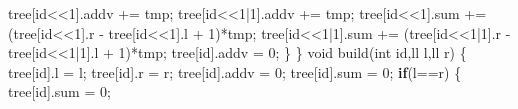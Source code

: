 \documentclass[
]{article}
\newenvironment{Shaded}{}{}
\newcommand{\ControlFlowTok}[1]{\textcolor[rgb]{0.00,0.44,0.13}{\textbf{#1}}}
\newcommand{\DataTypeTok}[1]{\textcolor[rgb]{0.56,0.13,0.00}{#1}}
\newcommand{\DecValTok}[1]{\textcolor[rgb]{0.25,0.63,0.44}{#1}}
\newcommand{\NormalTok}[1]{#1}
\newcommand{\OperatorTok}[1]{\textcolor[rgb]{0.40,0.40,0.40}{#1}}
\begin{document}
\begin{Shaded}
\begin{Highlighting}[]
\NormalTok{        tree}\OperatorTok{[}\NormalTok{id}\OperatorTok{\textless{}\textless{}}\DecValTok{1}\OperatorTok{].}\NormalTok{addv }\OperatorTok{+=}\NormalTok{ tmp}\OperatorTok{;}  
\NormalTok{        tree}\OperatorTok{[}\NormalTok{id}\OperatorTok{\textless{}\textless{}}\DecValTok{1}\OperatorTok{|}\DecValTok{1}\OperatorTok{].}\NormalTok{addv }\OperatorTok{+=}\NormalTok{ tmp}\OperatorTok{;}  
\NormalTok{        tree}\OperatorTok{[}\NormalTok{id}\OperatorTok{\textless{}\textless{}}\DecValTok{1}\OperatorTok{].}\NormalTok{sum }\OperatorTok{+=} \OperatorTok{(}\NormalTok{tree}\OperatorTok{[}\NormalTok{id}\OperatorTok{\textless{}\textless{}}\DecValTok{1}\OperatorTok{].}\NormalTok{r }\OperatorTok{{-}}\NormalTok{ tree}\OperatorTok{[}\NormalTok{id}\OperatorTok{\textless{}\textless{}}\DecValTok{1}\OperatorTok{].}\NormalTok{l }\OperatorTok{+} \DecValTok{1}\OperatorTok{)*}\NormalTok{tmp}\OperatorTok{;}  
\NormalTok{        tree}\OperatorTok{[}\NormalTok{id}\OperatorTok{\textless{}\textless{}}\DecValTok{1}\OperatorTok{|}\DecValTok{1}\OperatorTok{].}\NormalTok{sum }\OperatorTok{+=} \OperatorTok{(}\NormalTok{tree}\OperatorTok{[}\NormalTok{id}\OperatorTok{\textless{}\textless{}}\DecValTok{1}\OperatorTok{|}\DecValTok{1}\OperatorTok{].}\NormalTok{r }\OperatorTok{{-}}\NormalTok{ tree}\OperatorTok{[}\NormalTok{id}\OperatorTok{\textless{}\textless{}}\DecValTok{1}\OperatorTok{|}\DecValTok{1}\OperatorTok{].}\NormalTok{l }\OperatorTok{+} \DecValTok{1}\OperatorTok{)*}\NormalTok{tmp}\OperatorTok{;}  
\NormalTok{        tree}\OperatorTok{[}\NormalTok{id}\OperatorTok{].}\NormalTok{addv }\OperatorTok{=} \DecValTok{0}\OperatorTok{;}  
    \OperatorTok{\}}  
\OperatorTok{\}}  
\DataTypeTok{void}\NormalTok{ build}\OperatorTok{(}\DataTypeTok{int}\NormalTok{ id}\OperatorTok{,}\NormalTok{ll l}\OperatorTok{,}\NormalTok{ll r}\OperatorTok{)} \OperatorTok{\{}  
\NormalTok{    tree}\OperatorTok{[}\NormalTok{id}\OperatorTok{].}\NormalTok{l }\OperatorTok{=}\NormalTok{ l}\OperatorTok{;}  
\NormalTok{    tree}\OperatorTok{[}\NormalTok{id}\OperatorTok{].}\NormalTok{r }\OperatorTok{=}\NormalTok{ r}\OperatorTok{;}  
\NormalTok{    tree}\OperatorTok{[}\NormalTok{id}\OperatorTok{].}\NormalTok{addv }\OperatorTok{=} \DecValTok{0}\OperatorTok{;}  
\NormalTok{    tree}\OperatorTok{[}\NormalTok{id}\OperatorTok{].}\NormalTok{sum }\OperatorTok{=} \DecValTok{0}\OperatorTok{;}  
    \ControlFlowTok{if}\OperatorTok{(}\NormalTok{l}\OperatorTok{==}\NormalTok{r}\OperatorTok{)}  \OperatorTok{\{}  
\NormalTok{        tree}\OperatorTok{[}\NormalTok{id}\OperatorTok{].}\NormalTok{sum }\OperatorTok{=} \DecValTok{0}\OperatorTok{;}  

\end{Highlighting}
\end{Shaded}
\end{document}
